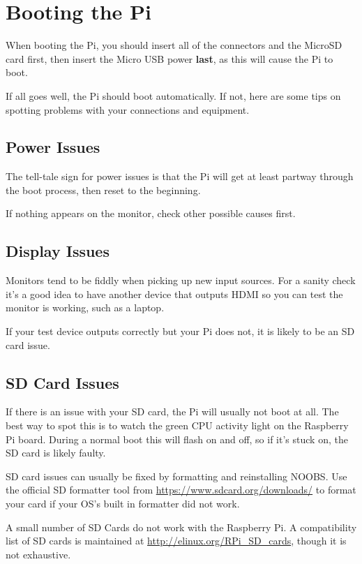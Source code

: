 \section{Booting the Pi}
\label{sec:setup}

	When booting the Pi, you should insert all of the connectors and the MicroSD card first, then insert the Micro USB power \textbf{last}, as this will cause the Pi to boot.
	
	If all goes well, the Pi should boot automatically. If not, here are some tips on spotting problems with your connections and equipment.
	
	\subsection*{Power Issues}
		
		The tell-tale sign for power issues is that the Pi will get at least partway through the boot process, then reset to the beginning.
		
		If nothing appears on the monitor, check other possible causes first.
		
	\subsection*{Display Issues}
	
		Monitors tend to be fiddly when picking up new input sources. For a sanity check it's a good idea to have another device that outputs HDMI so you can test the monitor is working, such as a laptop.
		
		If your test device outputs correctly but your Pi does not, it is likely to be an SD card issue.
		
	\subsection*{SD Card Issues}
	
		If there is an issue with your SD card, the Pi will usually not boot at all. The best way to spot this is to watch the green CPU activity light on the Raspberry Pi board. During a normal boot this will flash on and off, so if it's stuck on, the SD card is likely faulty.
	
		SD card issues can usually be fixed by formatting and reinstalling NOOBS. Use the official SD formatter tool from \url{https://www.sdcard.org/downloads/} to format your card if your OS's built in formatter did not work.
		
		A small number of SD Cards do not work with the Raspberry Pi. A compatibility list of SD cards is maintained at \url{http://elinux.org/RPi_SD_cards}, though it is not exhaustive.